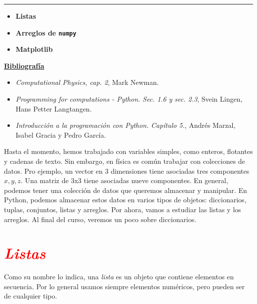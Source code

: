 \documentclass[12pt]{article}
\begin{document}
		\thispagestyle{firstpage}
		\vspace*{1.5cm}
	
	\begin{center}
		\rule{\textwidth}{0.4pt}
	\end{center}
	
	\begin{itemize}[leftmargin=*,label=\textcolor{red}{\ensuremath{\blacktriangleright}}]
		\item \textbf{Listas}
		\item \textbf{Arreglos de \texttt{numpy}}
		\item \textbf{Matplotlib}
	\end{itemize}
	
	\noindent
	\textbf{\underline{Bibliografía}}
	\begin{itemize}[leftmargin=*, label={\textcolor{blue}{$\bullet$}}]
		\item \textit{Computational Physics, cap. 2}, Mark Newman.
		\item \textit{Programming for computations - Python. Sec. 1.6 y sec. 2.3}, Svein Lingen, Hans Petter Langtangen.
        \item \textit{Introducción a la programación con Python. Capítulo 5.}, Andrés Marzal, Isabel Gracia y Pedro García.
	\end{itemize}
     
    
    Hasta el momento, hemos trabajado con variables simples, como enteros, flotantes y cadenas de texto. Sin embargo, en física es común
    trabajar con colecciones de datos. Pro ejemplo, un vector en 3 dimensiones tiene asociadas tres componentes $x, y, z$. Una matriz de 3x3 
    tiene asociadas nueve componentes. En general, podemos tener una colección de datos que queremos almacenar y manipular.
    En Python, podemos almacenar estos datos en varios tipos de objetos: diccionarios, tuplas, conjuntos, 
    listas y arreglos. Por ahora, vamos a estudiar las listas y los arreglos. Al final del curso, 
    veremos un poco sobre diccionarios.


\section*{\textcolor{red}{\textit{Listas}}}
	Como su nombre lo indica, una \textit{lista} es un objeto que contiene elementos en secuencia. 
    Por lo general usamos siempre elementos numéricos, pero pueden ser de cualquier tipo. 
\end{document}

